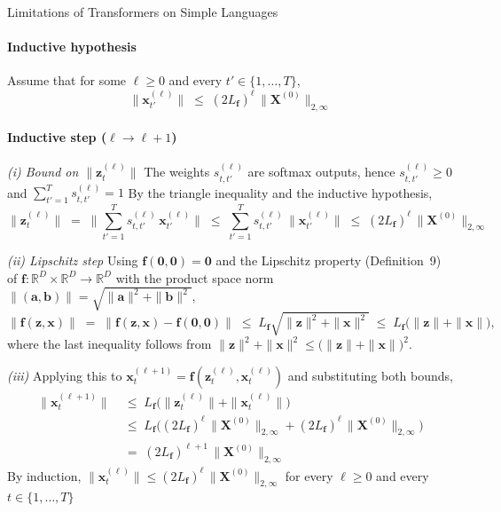 \begin{question}{Limitations of Transformers on Simple Languages}
\begin{subquestion}
    \paragraph{Inductive hypothesis}
    Assume that for some $\ell \ge 0$ and every $t' \in \{1, \dots, T\}$,
    \begin{equation*}
        \|\mathbf{x}_{t'}^{(\ell)}\| \;\le\; (2L_{\mathbf{f}})^{\ell}\,\|\mathbf{X}^{(0)}\|_{2,\infty}
    \end{equation*}

    \paragraph{Inductive step ($\ell \to \ell+1$)}
    \emph{(i) Bound on $\|\mathbf{z}_t^{(\ell)}\|$} 
    The weights $s_{t,t'}^{(\ell)}$ are softmax outputs, hence $s_{t,t'}^{(\ell)} \ge 0$ and $\sum_{t'=1}^{T} s_{t,t'}^{(\ell)} = 1$
    By the triangle inequality and the inductive hypothesis,
    \begin{equation*}
        \|\mathbf{z}_t^{(\ell)}\| \;=\; \Bigg\|\sum_{t'=1}^{T} s_{t,t'}^{(\ell)}\, \mathbf{x}_{t'}^{(\ell)}\Bigg\| \;\le\; \sum_{t'=1}^{T} s_{t,t'}^{(\ell)}\, \|\mathbf{x}_{t'}^{(\ell)}\| \;\le\; (2L_{\mathbf{f}})^{\ell}\,\|\mathbf{X}^{(0)}\|_{2,\infty}
    \end{equation*}

    \emph{(ii) Lipschitz step} Using $\mathbf{f}(\mathbf{0}, \mathbf{0}) = \mathbf{0}$ and the Lipschitz property (Definition~9) of $\mathbf{f}: \mathbb{R}^{D} \times \mathbb{R}^{D} \to \mathbb{R}^{D}$ with the product space norm $\|(\mathbf{a}, \mathbf{b})\| = \sqrt{\|\mathbf{a}\|^{2} + \|\mathbf{b}\|^{2}}$,
    \begin{equation*}
        \|\mathbf{f}(\mathbf{z}, \mathbf{x})\| \;=\; \|\mathbf{f}(\mathbf{z}, \mathbf{x}) - \mathbf{f}(\mathbf{0}, \mathbf{0})\| \;\le\; L_{\mathbf{f}}\sqrt{\|\mathbf{z}\|^{2} + \|\mathbf{x}\|^{2}} \;\le\; L_{\mathbf{f}}\bigl(\|\mathbf{z}\| + \|\mathbf{x}\|\bigr),
    \end{equation*}
    where the last inequality follows from $\|\mathbf{z}\|^{2} + \|\mathbf{x}\|^{2} \le \bigl(\|\mathbf{z}\| + \|\mathbf{x}\|\bigr)^{2}$.

    \emph{(iii)} Applying this to $\mathbf{x}_t^{(\ell+1)} = \mathbf{f}(\mathbf{z}_t^{(\ell)}, \mathbf{x}_t^{(\ell)})$ and substituting both bounds,
    \begin{align*}
        \|\mathbf{x}_t^{(\ell+1)}\|
        &\;\le\; L_{\mathbf{f}}\bigl(\|\mathbf{z}_t^{(\ell)}\| + \|\mathbf{x}_t^{(\ell)}\|\bigr) \\
        &\;\le\; L_{\mathbf{f}}\bigl((2L_{\mathbf{f}})^{\ell}\,\|\mathbf{X}^{(0)}\|_{2,\infty} + (2L_{\mathbf{f}})^{\ell}\,\|\mathbf{X}^{(0)}\|_{2,\infty}\bigr) \\
        &\;=\; (2L_{\mathbf{f}})^{\ell+1}\,\|\mathbf{X}^{(0)}\|_{2,\infty}
    \end{align*}
    By induction, $\|\mathbf{x}_t^{(\ell)}\| \le (2L_{\mathbf{f}})^{\ell}\,\|\mathbf{X}^{(0)}\|_{2,\infty}$ for every $\ell \ge 0$ and every $t \in \{1, \dots, T\}$
\end{subquestion}


\end{question}
